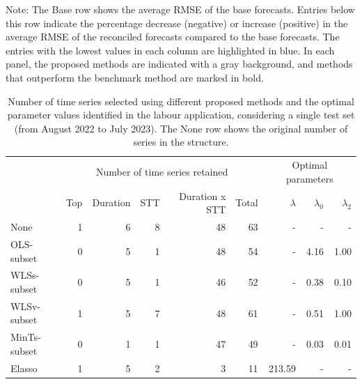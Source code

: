 \documentclass[
  11pt]{article}
\begin{document}
\begin{table}
{\begin{threeparttable}
\begin{tabular}{lrrrrrrrrrrrrrrrrrrrr}
\bottomrule
\end{tabular}
\begin{tablenotes}[para]
\item Note: The Base row shows the average RMSE of the base forecasts. Entries below this row indicate the percentage decrease (negative) or increase (positive) in the average RMSE of the reconciled forecasts compared to the base forecasts. The entries with the lowest values in each column are highlighted in blue. In each panel, the proposed methods are indicated with a gray background, and methods that outperform the benchmark method are marked in bold.
\end{tablenotes}
\end{threeparttable}}
\end{table}

\hypertarget{tbl-labour-info}{}
\begin{table}
\caption{\label{tbl-labour-info}Number of time series selected using different proposed methods and the
optimal parameter values identified in the labour application,
considering a single test set (from August 2022 to July 2023). The None
row shows the original number of series in the structure. }\tabularnewline

\centering\begingroup\fontsize{10}{12}\selectfont

\begin{tabular}{lrrrrrrrr}
\toprule
\multicolumn{1}{c}{} & \multicolumn{5}{c}{Number of time series retained} & \multicolumn{3}{c}{Optimal parameters} \\
\cmidrule(l{3pt}r{3pt}){2-6} \cmidrule(l{3pt}r{3pt}){7-9}
  & Top & Duration & STT & Duration x STT & Total & $\lambda$ & $\lambda_0$ & $\lambda_2$\\
\midrule
None & 1 & 6 & 8 & 48 & 63 & - & - & -\\
OLS-subset & 0 & 5 & 1 & 48 & 54 & - & 4.16 & 1.00\\
WLSs-subset & 0 & 5 & 1 & 46 & 52 & - & 0.38 & 0.10\\
WLSv-subset & 1 & 5 & 7 & 48 & 61 & - & 0.51 & 1.00\\
MinTs-subset & 0 & 1 & 1 & 47 & 49 & - & 0.03 & 0.01\\
Elasso & 1 & 5 & 2 & 3 & 11 & 213.59 & - & -\\
\bottomrule
\end{tabular}
\endgroup{}
\end{table}
\end{document}
